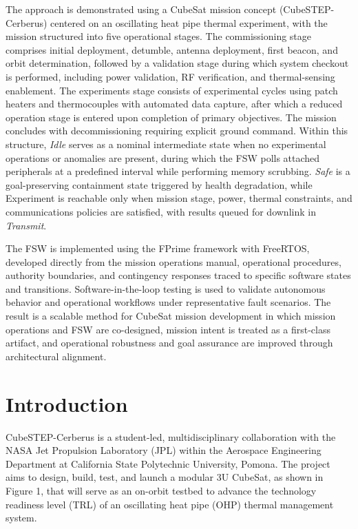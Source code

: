 \documentclass[10pt,letterpaper,twoside,fleqn]{article}
\newcommand{\Indent}{\hspace*{4\fontdimen2\font}}
\begin{document}
 The approach is demonstrated using a CubeSat mission concept (CubeSTEP-Cerberus) centered on an oscillating heat pipe thermal experiment, with the mission structured into five operational stages.
The commissioning stage comprises initial deployment, detumble, antenna deployment, first beacon, and orbit determination, followed by a validation stage during which system checkout is performed, including power validation, RF verification, and thermal-sensing enablement.
The experiments stage consists of experimental cycles using patch heaters and thermocouples with automated data capture, after which a reduced operation stage is entered upon completion of primary objectives.
The mission concludes with decommissioning requiring explicit ground command.
Within this structure, \textit{Idle} serves as a nominal intermediate state when no experimental operations or anomalies are present, during which the FSW polls attached peripherals at a predefined interval while performing memory scrubbing.
\textit{Safe} is a goal-preserving containment state triggered by health degradation, while Experiment is reachable only when mission stage, power, thermal constraints, and communications policies are satisfied, with results queued for downlink in \textit{Transmit}.


 The FSW is implemented using the FPrime framework with FreeRTOS, developed directly from the mission operations manual, operational procedures, authority boundaries, and contingency responses traced to specific software states and transitions.
Software-in-the-loop testing is used to validate autonomous behavior and operational workflows under representative fault scenarios.
The result is a scalable method for CubeSat mission development in which mission operations and FSW are co-designed, mission intent is treated as a first-class artifact, and operational robustness and goal assurance are improved through architectural alignment. 

\endgroup
\clearpage
\twocolumn
\raggedbottom

\section{Introduction}

\Indent CubeSTEP-Cerberus is a student-led, multidisciplinary collaboration with the NASA Jet Propulsion Laboratory (JPL) within the Aerospace Engineering Department at California State Polytechnic University, Pomona. 
The project aims to design, build, test, and launch a modular 3U CubeSat, as shown in Figure 1, that will serve as an on-orbit testbed to advance the technology readiness level (TRL) of an oscillating heat pipe (OHP) thermal management system.
\end{document}
